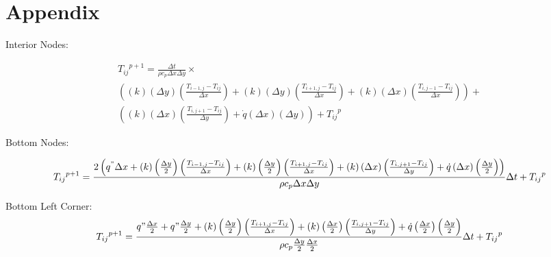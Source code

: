 \section{Appendix}

Interior Nodes:
\begin{small}
\begin{equation}
\begin{gathered}
    { { T }_{ ij } }^{ p+1 }=\frac { \Delta t }{ \rho { c }_{ p }\Delta x\Delta y } \times \\ 
    \left(\left( k \right) \left( \Delta y \right) \left( \frac { { T }_{ i-1,j }-{ T }_{ ij } }{ \Delta x }  \right) +\left( k \right) \left( \Delta y \right) \left( \frac { { T }_{ i+1,j }-{ T }_{ ij } }{ \Delta x }  \right) +\left( k \right) \left( \Delta x \right) \left( \frac { { T }_{ i,j-1 }-{ T }_{ ij } }{ \Delta x }  \right)\right) +\\
    \left(\left( k \right) \left( \Delta x \right) \left( \frac { { T }_{ i,j+1 }-{ T }_{ ij } }{ \Delta y }  \right) +\dot { q } \left( \Delta x \right) \left( \Delta y \right) \right) +{ { T }_{ ij } }^{ p }
\end{gathered}
\end{equation}
\end{small}%
%
Bottom Nodes:
\begin{small}
\begin{equation}
\begin{gathered}
    { { T }_{ ij } }^{ p+1 }=\frac { 2\left( { q }^{ " }\Delta x+\left( k \right) \left( \frac { \Delta y }{ 2 }  \right) \left( \frac { { T }_{ i-1,j }-{ T }_{ ij } }{ \Delta x }  \right) +\left( k \right) \left( \frac { \Delta y }{ 2 }  \right) \left( \frac { { T }_{ i+1,j }-{ T }_{ ij } }{ \Delta x }  \right) +\left( k \right) \left( \Delta x \right) \left( \frac { { T }_{ i,j+1 }-{ T }_{ ij } }{ \Delta y }  \right) +\dot { q } \left( \Delta x \right) \left( \frac { \Delta y }{ 2 }  \right)  \right)  }{ \rho { c }_{ p }\Delta x\Delta y } \Delta t+{ { T }_{ ij } }^{ p }
\end{gathered}
\end{equation}
\end{small}%
%
Bottom Left Corner:
\begin{equation}
\begin{gathered}
    { { T }_{ ij } }^{ p+1 }=\frac { { q }"\frac { \Delta x }{ 2 } +q"\frac { \Delta y }{ 2 } +\left( k \right) \left( \frac { \Delta y }{ 2 }  \right) \left( \frac { { T }_{ i+1,j }-{ T }_{ ij } }{ \Delta x }  \right) +\left( k \right) \left( \frac { \Delta x }{ 2 }  \right) \left( \frac { { T }_{ i,j+1 }-{ T }_{ ij } }{ \Delta y }  \right) +\dot { q } \left( \frac { \Delta x }{ 2 }  \right) \left( \frac { \Delta y }{ 2 }  \right)  }{ \rho { c }_{ p }\frac { \Delta y }{ 2 } \frac { \Delta x }{ 2 }  } \Delta t+{ { T }_{ ij } }^{ p }
\end{gathered}
\end{equation}
